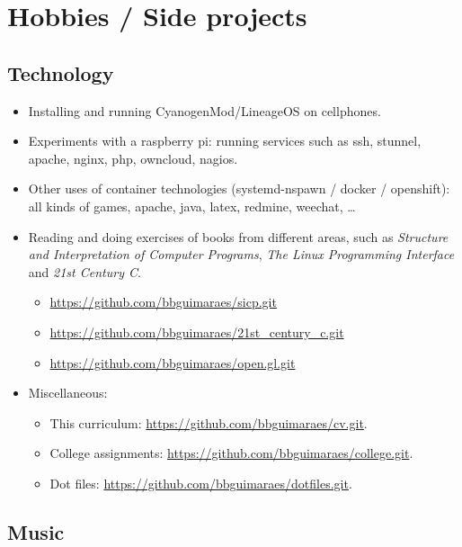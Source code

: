 \section*{Hobbies / Side projects}

\subsection*{Technology}

\begin{itemize}
    \item Installing and running CyanogenMod/LineageOS on cellphones.
    \item
        Experiments with a raspberry pi: running services such as ssh, stunnel,
        apache, nginx, php, owncloud, nagios.
    \item
        Other uses of container technologies (systemd-nspawn / docker /
        openshift): all kinds of games, apache, java, latex, redmine, weechat,
        …
    \item
        Reading and doing exercises of books from different areas, such as
        \textit{Structure and Interpretation of Computer Programs}, \textit{The
        Linux Programming Interface} and \textit{21st Century C}.
        \begin{itemize}
            \item \url{https://github.com/bbguimaraes/sicp.git}
            \item \url{https://github.com/bbguimaraes/21st_century_c.git}
            \item \url{https://github.com/bbguimaraes/open.gl.git}
        \end{itemize}
    \item Miscellaneous:
        \begin{itemize}
            \item
                This curriculum:
                \url{https://github.com/bbguimaraes/cv.git}.
            \item
                College assignments:
                \url{https://github.com/bbguimaraes/college.git}.
            \item
                Dot files:
                \url{https://github.com/bbguimaraes/dotfiles.git}.
        \end{itemize}
\end{itemize}

\subsection*{Music}

